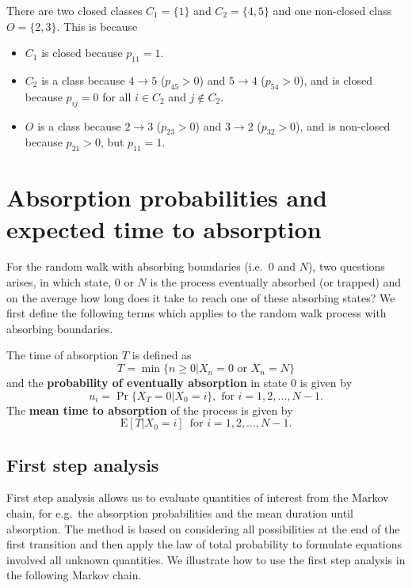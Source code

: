 \documentclass[
]{book}
\theoremstyle{definition}
\theoremstyle{definition}
\theoremstyle{definition}
\theoremstyle{definition}
\theoremstyle{remark}
\begin{document}
There are two closed classes \(C_1 = \{1\}\) and \(C_2 = \{4,5\}\) and one
non-closed class \(O = \{ 2,3\}\). This is because

\begin{itemize}
\item
  \(C_1\) is closed because \(p_{11} = 1\).
\item
  \(C_2\) is a class because \(4 \rightarrow 5\) (\(p_{45} >0\)) and
  \(5 \rightarrow 4\) (\(p_{54} >0\)), and is closed because \(p_{ij} = 0\)
  for all \(i \in C_2\) and \(j \not\in C_2\).
\item
  \(O\) is a class because \(2 \rightarrow 3\) (\(p_{23} >0\)) and
  \(3 \rightarrow 2\) (\(p_{32} > 0\)), and is non-closed because
  \(p_{21} > 0\), but \(p_{11} = 1\).
\end{itemize}

\hypertarget{absorption-probabilities-and-expected-time-to-absorption}{%
\chapter{Absorption probabilities and expected time to absorption}\label{absorption-probabilities-and-expected-time-to-absorption}}

For the random walk with absorbing boundaries (i.e.~\(0\) and \(N\)), two
questions arises, in which state, \(0\) or \(N\) is the process eventually
absorbed (or trapped) and on the average how long does it take to reach
one of these absorbing states? We first define the following terms which
applies to the random walk process with absorbing boundaries.

The time of absorption \(T\) is defined as
\[T = \min\{ n \ge 0 | X_n = 0 \text{ or } X_n = N \}\] and the
\textbf{probability of eventually absorption} in state 0 is given by
\[u_i = \Pr\{ X_T = 0 | X_0 = i  \}, \text{ for } i = 1,2,\ldots,N-1.\]
The \textbf{mean time to absorption} of the process is given by
\[\mathrm{E}[T |  X_0 = i ] \, \text{ for } i = 1,2,\ldots,N-1.\]

\hypertarget{first-step-analysis}{%
\section{First step analysis}\label{first-step-analysis}}

First step analysis allows us to evaluate quantities of interest from
the Markov chain, for e.g.~the absorption probabilities and the mean
duration until absorption. The method is based on considering all
possibilities at the end of the first transition and then apply the law
of total probability to formulate equations involved all unknown
quantities. We illustrate how to use the first step analysis in the
following Markov chain.
\end{document}
